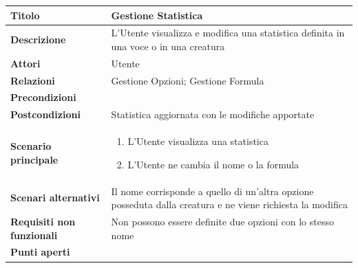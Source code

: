 \documentclass[a4paper, 11pt]{article}
\begin{document}
\begin{center}
\vspace{3em}

\begin{tabular}{ |p{5cm}|p{9.5cm}|  }
\hline
\textbf{Titolo} & Gestione Statistica \\
\hline
\textbf{Descrizione} & L'Utente visualizza e modifica una statistica definita in una voce o in una creatura \\
\hline
\textbf{Attori} & Utente  \\
\hline
\textbf{Relazioni} & Gestione Opzioni; Gestione Formula \\
\hline
\textbf{Precondizioni} &  \\
\hline
\textbf{Postcondizioni} & Statistica aggiornata con le modifiche apportate \\
\hline
\textbf{Scenario principale} & 
\begin{enumerate}
    \item L'Utente visualizza una statistica
    \item L'Utente ne cambia il nome o la formula
\end{enumerate}
\\
\hline
\textbf{Scenari alternativi} & Il nome corrisponde a quello di un'altra opzione posseduta dalla creatura e ne viene richiesta la modifica\\
\hline
    \textbf{Requisiti non funzionali} & Non possono essere definite due opzioni con lo stesso nome\\
\hline
\textbf{Punti aperti} &  \\
\hline
\end{tabular}

\vspace{3em}


\end{center}
\end{document}
